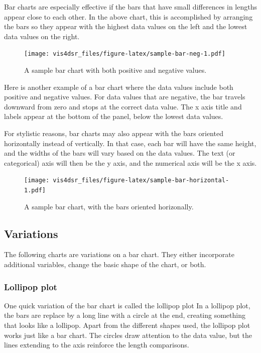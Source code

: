 \documentclass[
]{krantz}
\begin{document}
Bar charts are especially effective if the bars that have small differences in
lengths appear close to each other. In the above chart, this is accomplished by
arranging the bars so they appear with the highest data values on the left and
the lowest data values on the right.

\begin{figure}
\centering
\texttt{[image: vis4dsr\_files/figure-latex/sample-bar-neg-1.pdf]}
\caption{\label{fig:sample-bar-neg}A sample bar chart with both positive and negative values.}
\end{figure}

Here is another example of a bar chart where the data values include both positive
and negative values. For data values that are negative, the bar travels downward
from zero and stops at the correct data value. The x axis title and labels appear
at the bottom of the panel, below the lowest data values.

For stylistic reasons, bar charts may also appear with the bars oriented horizontally
instead of vertically. In that case, each bar will have the same height, and the widths
of the bars will vary based on the data values. The text (or categorical) axis will then
be the y axis, and the numerical axis will be the x axis.

\begin{figure}
\centering
\texttt{[image: vis4dsr\_files/figure-latex/sample-bar-horizontal-1.pdf]}
\caption{\label{fig:sample-bar-horizontal}A sample bar chart, with the bars oriented horizonally.}
\end{figure}

\hypertarget{variations}{%
\subsection{Variations}\label{variations}}

The following charts are variations on a bar chart. They either incorporate
additional variables, change the basic shape of the chart, or both.

\hypertarget{lollipop-plot}{%
\subsubsection{Lollipop plot}\label{lollipop-plot}}

One quick variation of the bar chart is called the lollipop plot In a lollipop plot,
the bars are replace by a long line with a circle at the end, creating something
that looks like a lollipop. Apart from the different shapes used, the lollipop plot
works just like a bar chart. The circles draw attention to the data value, but the
lines extending to the axis reinforce the length comparisons.
\end{document}
